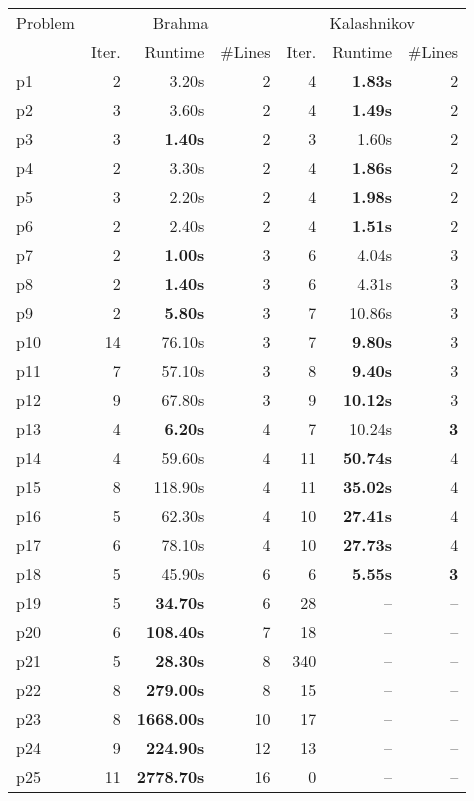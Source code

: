 \begin{tabular}{l||rrr|rrr}
Problem & \multicolumn{3}{c}{\sc Brahma} & \multicolumn{3}{|c}{\sc Kalashnikov} \\
        & Iter. & Runtime & \#Lines & Iter. & Runtime & \#Lines \\
\hline
\hline
p1 & 2 & 3.20s &2 &4 & {\bf 1.83s} &2 \\
p2 & 3 & 3.60s &2 &4 & {\bf 1.49s} &2 \\
p3 & 3 & {\bf 1.40s} &2 &3 & 1.60s &2 \\
p4 & 2 & 3.30s &2 &4 & {\bf 1.86s} &2 \\
p5 & 3 & 2.20s &2 &4 & {\bf 1.98s} &2 \\
p6 & 2 & 2.40s &2 &4 & {\bf 1.51s} &2 \\
p7 & 2 & {\bf 1.00s} &3 &6 & 4.04s &3 \\
p8 & 2 & {\bf 1.40s} &3 &6 & 4.31s &3 \\
p9 & 2 & {\bf 5.80s} &3 &7 & 10.86s &3 \\
p10 & 14 & 76.10s &3 &7 & {\bf 9.80s} &3 \\
p11 & 7 & 57.10s &3 &8 & {\bf 9.40s} &3 \\
p12 & 9 & 67.80s &3 &9 & {\bf 10.12s} &3 \\
p13 & 4 & {\bf 6.20s} &4 &7 & 10.24s &{\bf 3} \\
p14 & 4 & 59.60s &4 &11 & {\bf 50.74s} &4 \\
p15 & 8 & 118.90s &4 &11 & {\bf 35.02s} &4 \\
p16 & 5 & 62.30s &4 &10 & {\bf 27.41s} &4 \\
p17 & 6 & 78.10s &4 &10 & {\bf 27.73s} &4 \\
p18 & 5 & 45.90s &6 &6 & {\bf 5.55s} &{\bf 3} \\
p19 & 5 & {\bf 34.70s} &6 &28 & -- &-- \\
p20 & 6 & {\bf 108.40s} &7 &18 & -- &-- \\
p21 & 5 & {\bf 28.30s} &8 &340 & -- &-- \\
p22 & 8 & {\bf 279.00s} &8 &15 & -- &-- \\
p23 & 8 & {\bf 1668.00s} &10 &17 & -- &-- \\
p24 & 9 & {\bf 224.90s} &12 &13 & -- &-- \\
p25 & 11 & {\bf 2778.70s} &16 &0 & -- &-- \\
\end{tabular}
